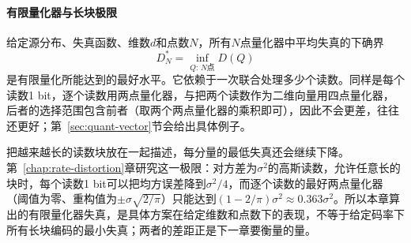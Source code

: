 \paragraph{有限量化器与长块极限}

给定源分布、失真函数、维数$d$和点数$N$，所有$N$点量化器中平均失真的下确界
\[
 D_N^{*}=\inf_{Q:\,N\text{点}}D(Q)
\]
是有限量化所能达到的最好水平。它依赖于一次联合处理多少个读数。同样是每个读数1 bit，逐个读数用两点量化器，与把两个读数作为二维向量用四点量化器，后者的选择范围包含前者（取两个两点量化器的乘积即可），因此不会更差，往往还更好；第~\ref{sec:quant-vector}节会给出具体例子。

把越来越长的读数块放在一起描述，每分量的最低失真还会继续下降。第~\ref{chap:rate-distortion}章研究这一极限：对方差为$\sigma^{2}$的高斯读数，允许任意长的块时，每个读数1 bit可以把均方误差降到$\sigma^{2}/4$，而逐个读数的最好两点量化器（阈值为零、重构值为$\pm\sigma\sqrt{2/\pi}$）只能达到$(1-2/\pi)\sigma^{2}\approx0.363\sigma^{2}$。所以本章算出的有限量化器失真，是具体方案在给定维数和点数下的表现，不等于给定码率下所有长块编码的最小失真；两者的差距正是下一章要衡量的量。
